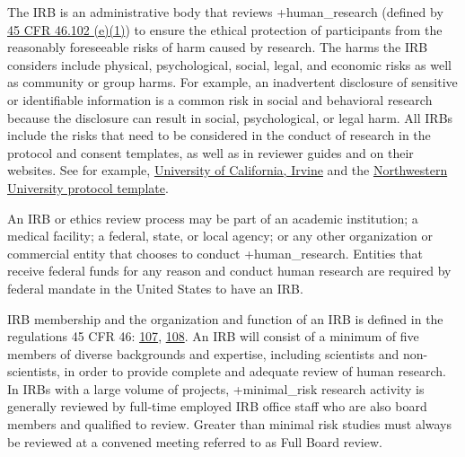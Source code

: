 \documentclass[
]{WileySix}
\begin{document}
The IRB is an administrative body that reviews +human\_research\textbar{} (defined by \href{https://www.law.cornell.edu/cfr/text/45/46.102}{45 CFR 46.102 (e)(1)}) to ensure the ethical protection of participants from the reasonably foreseeable risks of harm caused by research. The harms the IRB considers include physical, psychological, social, legal, and economic risks as well as community or group harms. For example, an inadvertent disclosure of sensitive or identifiable information is a common risk in social and behavioral research because the disclosure can result in social, psychological, or legal harm. All IRBs include the risks that need to be considered in the conduct of research in the protocol and consent templates, as well as in reviewer guides and on their websites. See for example, \href{https://research.uci.edu/compliance/human-research-protections/irb-members/assessing-risks-and-benefits.html}{University of California, Irvine} and the \href{https://www.irb.northwestern.edu/templates-forms-sops}{Northwestern University protocol template}.

An IRB or ethics review process may be part of an academic institution; a medical facility; a federal, state, or local agency; or any other organization or commercial entity that chooses to conduct +human\_research\textbar. Entities that receive federal funds for any reason and conduct human research are required by federal mandate in the United States to have an IRB.

IRB membership and the organization and function of an IRB is defined in the regulations 45 CFR 46: \href{https://www.law.cornell.edu/cfr/text/45/46.107}{107}, \href{https://www.law.cornell.edu/cfr/text/45/46.108}{108}. An IRB will consist of a minimum of five members of diverse backgrounds and expertise, including scientists and non-scientists, in order to provide complete and adequate review of human research. In IRBs with a large volume of projects, +minimal\_risk\textbar{} research activity is generally reviewed by full-time employed IRB office staff who are also board members and qualified to review. Greater than minimal risk studies must always be reviewed at a convened meeting referred to as Full Board review.
\end{document}
